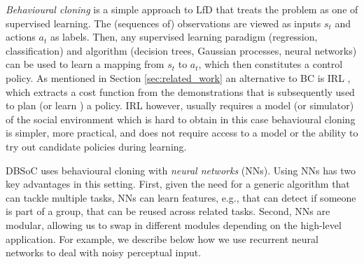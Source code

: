 \documentclass[letterpaper, 10 pt, conference]{ieeeconf}
\newcommand{\sw}[1]{\textcolor{red}{SW: #1}}
\newcommand{\ks}[1]{\textcolor{mypurp}{KS: #1}}
\begin{document}
\emph{Behavioural cloning} is a simple approach to LfD that treats the problem as one of supervised learning. The (sequences of) observations are viewed as inputs $s_t$ and actions $a_t$ as labels.  Then, any supervised learning paradigm (regression, classification) and algorithm (decision trees, Gaussian processes, neural networks) \cite{bishop2006pattern} can be used to learn a mapping from $s_t$ to $a_t$, which then constitutes a control policy. As mentioned in Section \ref{sec:related_work} an alternative to BC is IRL \cite{abbeel2004apprenticeship}, which extracts a cost function from the demonstrations that is subsequently used to plan (or learn \cite{boularias2011relative}) a policy. IRL however, usually requires a model (or simulator) of the social environment which is hard to obtain in this case behavioural cloning is simpler, more practical, and does not require access to a model or the ability to try out candidate policies during learning. %

DBSoC uses behavioural cloning with \emph{neural networks} (NNs).  Using NNs has two key advantages in this setting.  First, given the need for a generic algorithm that can tackle multiple tasks, NNs can learn features, e.g., that can detect if someone is part of a group, that can be reused across related tasks.  Second, NNs are modular, allowing us to swap in different modules depending on the high-level application. For example, we describe below how we use
recurrent neural networks to deal with noisy perceptual input.


\end{document}
